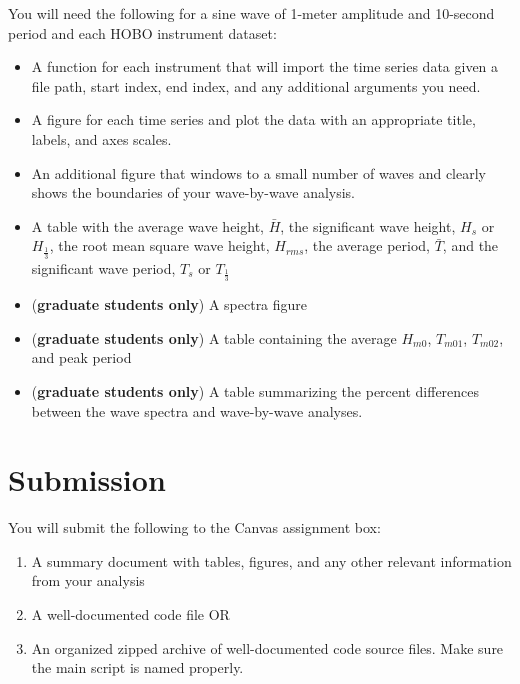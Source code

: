 \documentclass[
	letterpaper, %
	fontsize=10pt, %
	twoside=true, %
	numbers=noenddot, %
]{kaobook}
\begin{document}
You will need the following for a sine wave of 1-meter amplitude and 10-second period and each HOBO instrument dataset:

\begin{itemize}
    \item A function for each instrument that will import the time series data given a file path, start index, end index, and any additional arguments you need.
    \item A figure for each time series and plot the data with an appropriate title, labels, and axes scales.
    \item An additional figure that windows to a small number of waves and clearly shows the boundaries of your wave-by-wave analysis.
    \item A table with the average wave height, $\bar{H}$, the significant wave height, $H_s$ or $H_{\frac{1}{3}}$, the root mean square wave height, $H_{rms}$, the average period, $\bar{T}$, and the significant wave period, $T_s$ or $T_{\frac{1}{3}}$
    \item (\textbf{graduate students only}) A spectra figure 
    \item (\textbf{graduate students only}) A table containing the average $H_{m0}$, $T_{m01}$, $T_{m02}$, and peak period
    \item (\textbf{graduate students only}) A table summarizing the percent differences between the wave spectra and wave-by-wave analyses.
\end{itemize}


\section*{Submission}
You will submit the following to the Canvas assignment box:
\begin{enumerate}
    \item A summary document with tables, figures, and any other relevant information from your analysis
    \item A well-documented code file OR
    \item An organized zipped archive of well-documented code source files. Make sure the main script is named properly.
\end{enumerate}

\end{document}
